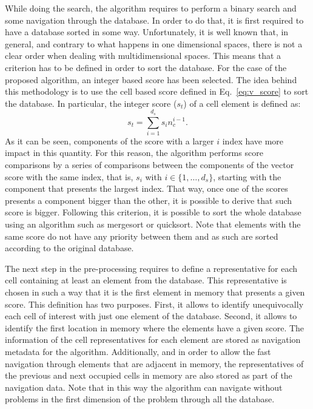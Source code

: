 \documentclass[review]{elsarticle}
\begin{document}
While doing the search, the algorithm requires to perform a binary search and some navigation through the database. In order to do that, it is first required to have a database sorted in some way. Unfortunately, it is well known that, in general, and contrary to what happens in one dimensional spaces, there is not a clear order when dealing with multidimensional spaces. This means that a criterion has to be defined in order to sort the database. For the case of the proposed algorithm, an integer based score has been selected. The idea behind this methodology is to use the cell based score defined in Eq.~\eqref{eq:v_score} to sort the database. In particular, the integer score ($s_t$) of a cell element is defined as:
\begin{equation}
s_t = \sum_{i = 1}^{d_s}s_in_c^{i-1}.
\end{equation}
As it can be seen, components of the score with a larger $i$ index have more impact in this quantity. For this reason, the algorithm performs score comparisons by a series of comparisons between the components of the vector score with the same index, that is, $s_i$ with $i\in \{1,\dots,d_s\}$, starting with the component that presents the largest index. That way, once one of the scores presents a component bigger than the other, it is possible to derive that such score is bigger. Following this criterion, it is possible to sort the whole database using an algorithm such as mergesort or quicksort. Note that elements with the same score do not have any priority between them and as such are sorted according to the original database.

The next step in the pre-processing requires to define a representative for each cell containing at least an element from the database. This representative is chosen in such a way that it is the first element in memory that presents a given score. This definition has two purposes. First, it allows to identify unequivocally each cell of interest with just one element of the database. Second, it allows to identify the first location in memory where the elements have a given score. The information of the cell representatives for each element are stored as navigation metadata for the algorithm. Additionally, and in order to allow the fast navigation through elements that are adjacent in memory, the representatives of the previous and next occupied cells in memory are also stored as part of the navigation data. Note that in this way the algorithm can navigate without problems in the first dimension of the problem through all the database.
\end{document}
